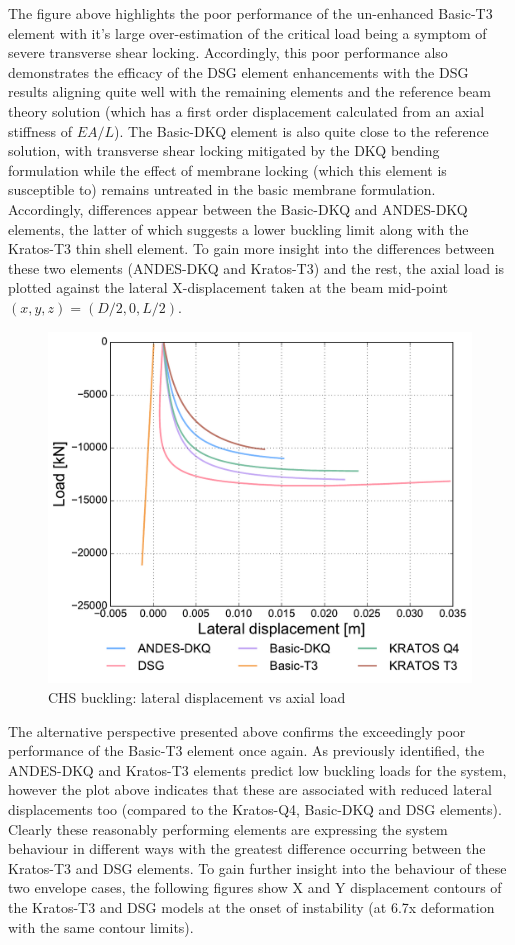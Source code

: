 The figure above highlights the poor performance of the un-enhanced Basic-T3 element with it's large over-estimation of the critical load being a symptom of severe transverse shear locking. Accordingly, this poor performance also demonstrates the efficacy of the DSG element enhancements with the DSG results aligning quite well with the remaining elements and the reference beam theory solution (which has a first order displacement calculated from an axial stiffness of $EA/L$). The Basic-DKQ element is also quite close to the reference solution, with transverse shear locking mitigated by the DKQ bending formulation while the effect of membrane locking (which this element is susceptible to) remains untreated in the basic membrane formulation. Accordingly, differences appear between the Basic-DKQ and ANDES-DKQ elements, the latter of which suggests a lower buckling limit along with the Kratos-T3 thin shell element. To gain more insight into the differences between these two elements (ANDES-DKQ and Kratos-T3) and the rest, the axial load is plotted against the lateral X-displacement taken at the beam mid-point $(x,y,z) = (D/2,0,L/2)$.

\begin{figure}[H]
	\centering
	\def\svgwidth{\columnwidth}
	\includegraphics[width=12cm]{images/stability_chs_trans_disp.pdf}
	\caption{CHS buckling: lateral displacement vs axial load}
	\label{pic:eulerchs2}
\end{figure}

The alternative perspective presented above confirms the exceedingly poor performance of the Basic-T3 element once again. As previously identified, the ANDES-DKQ and Kratos-T3 elements predict low buckling loads for the system, however the plot above indicates that these are associated with reduced lateral displacements too (compared to the Kratos-Q4, Basic-DKQ and DSG elements). Clearly these reasonably performing elements are expressing the system behaviour in different ways with the greatest difference occurring between the Kratos-T3 and DSG elements. To gain further insight into the behaviour of these two envelope cases, the following figures show X and Y displacement contours of the Kratos-T3 and DSG models at the onset of instability (at 6.7x deformation with the same contour limits).

